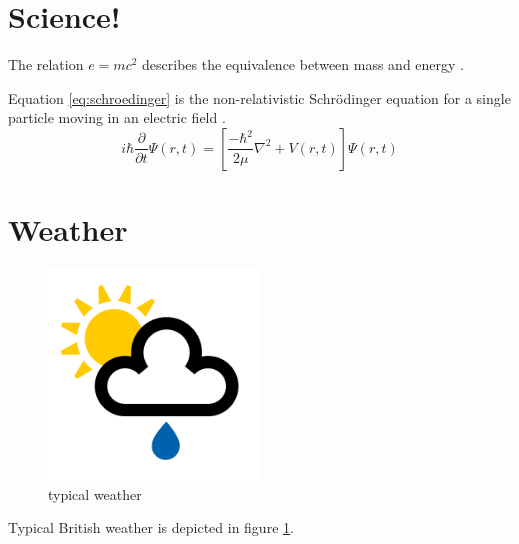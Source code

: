 \documentclass[12pt]{article}  %
\begin{document}
\section{Science!}
The relation $e=mc^2$ describes the equivalence between mass and energy \citep{massenergy}.

Equation \ref{eq:schroedinger} is the non-relativistic Schr\"{o}dinger equation for a single particle moving in an electric field \citep[see][]{Schroedinger1926}.
\begin{equation}
	i\hbar \frac{\partial{}} {\partial{t}} \Psi(r,t) = \left[\frac{-\hbar^2}{2 \mu} \nabla ^2 + V(r,t)\right] \Psi(r,t)
	\label{eq:schroedinger}
\end{equation}

\section{Weather}
\begin{figure}[h]
	\centering
	\includegraphics[width=0.5\textwidth]{showers}
	\caption{typical weather}
	\label{fig:weather}
\end{figure}

Typical British weather is depicted in figure \ref{fig:weather}.



\end{document}

